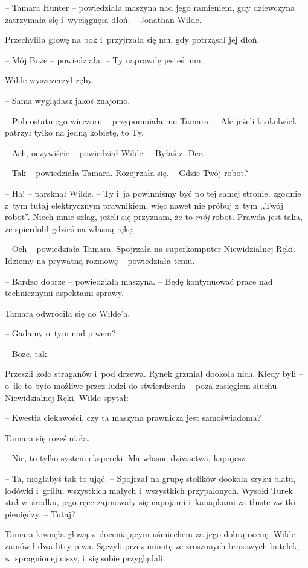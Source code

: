 \documentclass[oneside,polish,11pt,sfheadings]{mwbk}
\begin{document}
-- Tamara Hunter -- powiedziała maszyna nad jego ramieniem, gdy dziewczyna
zatrzymała się i~wyciągnęła dłoń. -- Jonathan Wilde.

Przechyliła głowę na bok i~przyjrzała się mu, gdy potrząsał jej dłoń.

-- Mój Boże -- powiedziała. -- Ty naprawdę jesteś nim.

Wilde wyszczerzył zęby. 

-- Sama wyglądasz jakoś znajomo.

-- Pub ostatniego wieczoru -- przypomniała mu Tamara. -- Ale jeżeli
ktokolwiek patrzył tylko na jedną kobietę, to Ty.

-- Ach, oczywiście -- powiedział Wilde. -- Byłaś z\ldots Dee.

-- Tak -- powiedziała Tamara. Rozejrzała się. -- Gdzie Twój robot?

-- Ha! -- parsknął Wilde. -- Ty i~ja powinniśmy być po tej samej stronie,
zgodnie z~tym tutaj elektrycznym prawnikiem, więc nawet nie próbuj z~tym
,,Twój robot''. Niech mnie szlag, jeżeli się przyznam, że to \emph{mój}
robot. Prawda jest taka, że spierdolił gdzieś na własną rękę.

-- Och -- powiedziała Tamara. Spojrzała na superkomputer Niewidzialnej
Ręki. -- Idziemy na prywatną rozmowę -- powiedziała temu.

-- Bardzo dobrze -- powiedziała maszyna. -- Będę kontynuować prace nad
technicznymi aspektami sprawy.

Tamara odwróciła się do Wilde'a. 

-- Gadamy o~tym nad piwem?

-- Boże, tak.

Przeszli koło straganów i~pod drzewa. Rynek grzmiał dookoła nich. Kiedy
byli -- o~ile to było możliwe przez ludzi do stwierdzenia -- poza
zasięgiem słuchu Niewidzialnej Ręki, Wilde spytał: 

-- Kwestia ciekawości,
czy ta maszyna prawnicza jest samoświadoma?

Tamara się roześmiała. 

-- Nie, to tylko system ekspercki. Ma własne
dziwactwa, kapujesz.

-- Ta, mogłabyś tak to ująć. -- Spojrzał na grupę stolików dookoła szyku
blatu, lodówki i~grillu, wszystkich małych i~wszystkich przypalonych.
Wysoki Turek stał w~środku, jego ręce zajmowały się napojami i~kanapkami
za tłuste zwitki pieniędzy. -- Tutaj?

Tamara kiwnęła głową z~doceniającym uśmiechem za jego dobrą ocenę. Wilde
zamówił dwa litry piwa. Sączyli przez minutę ze zroszonych brązowych
butelek, w~spragnionej ciszy, i~się sobie przyglądali.
\end{document}
